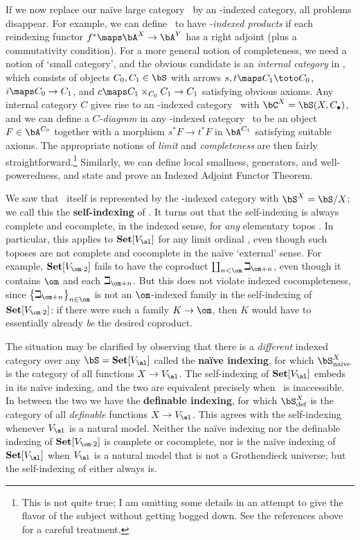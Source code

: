 \documentclass[12pt]{amsart}
\newcommand{\Set}{\ensuremath{\mathbf{Set}}}
\begin{document}
If we now replace our na\"ive large category \bA\ by an \bS-indexed
category, all problems disappear.  For example, we can define \bA\ to
have \emph{\bS-indexed products} if each reindexing functor $f^*\maps
\bA^X\to\bA^Y$ has a right adjoint (plus a commutativity condition).
For a more general notion of completeness, we need a notion of `small
category', and the obvious candidate is an \emph{internal category} in
\bS, which consists of objects $C_0,C_1\in\bS$ with arrows $s,t\maps
C_1\toto C_0$, $i\maps C_0\to C_1$, and $c\maps C_1\times_{C_0} C_1\to
C_1$ satisfying obvious axioms.  Any internal category $C$ gives rise
to an \bS-indexed category \bC\ with $\bC^X = \bS(X,C_\bullet)$, and
we can define a \emph{$C$-diagram} in any \bS-indexed category \bA\ to
be an object $F\in \bA^{C_0}$ together with a morphism $s^* F\to t^*F$
in $\bA^{C_1}$ satisfying suitable axioms.  The appropriate notions of
\emph{limit} and \emph{completeness} are then fairly
straightforward.\footnote{This is not quite true; I am omitting some
  details in an attempt to give the flavor of the subject without
  getting bogged down.  See the references above for a careful
  treatment.}  Similarly, we can define local smallness, generators,
and well-poweredness, and state and prove an Indexed Adjoint Functor
Theorem.

We saw that \bS\ itself is represented by the \bS-indexed category
with $\bS^X = \bS/X$; we call this the \textbf{self-indexing} of \bS.
It turns out that the self-indexing is always complete and cocomplete,
in the indexed sense, for \emph{any} elementary topos \bS.  In
particular, this applies to $\Set[V_\al]$ for any limit ordinal \al,
even though such toposes are not complete and cocomplete in the
na\"ive `external' sense.  For example, $\Set[V_{\om\cdot 2}]$ fails
to have the coproduct $\coprod_{n<\om}\beth_{\om+n}$, even though it
contains $\om$ and each $\beth_{\om+n}$.  But this does not violate
indexed cocompleteness, since $\big\{\beth_{\om+n}\big\}_{n\in\om}$ is
not an $\om$-indexed family in the self-indexing of $\Set[V_{\om\cdot
  2}]$: if there were such a family $K\to \om$, then $K$ would have to
essentially already \emph{be} the desired coproduct.

The situation may be clarified by observing that there is a
\emph{different} indexed category over any $\bS=\Set[V_\al]$ called
the \textbf{na\"ive indexing}, for which $\bS_{\text{na\"ive}}^X$ is
the category of all functions $X\to V_\al$.  The self-indexing of
$\Set[V_\al]$ embeds in its na\"ive indexing, and the two are
equivalent precisely when \al\ is inaccessible.  In between the two we
have the \textbf{definable indexing}, for which $\bS_{\text{def}}^X$
is the category of all \emph{definable} functions $X\to V_\al$.  This
agrees with the self-indexing whenever $V_\al$ is a natural model.
Neither the na\"ive indexing nor the definable indexing of
$\Set[V_{\om\cdot 2}]$ is complete or cocomplete, nor is the na\"ive
indexing of $\Set[V_\al]$ when $V_\al$ is a natural model that is not
a Grothendieck universe; but the self-indexing of either always is.
\end{document}
